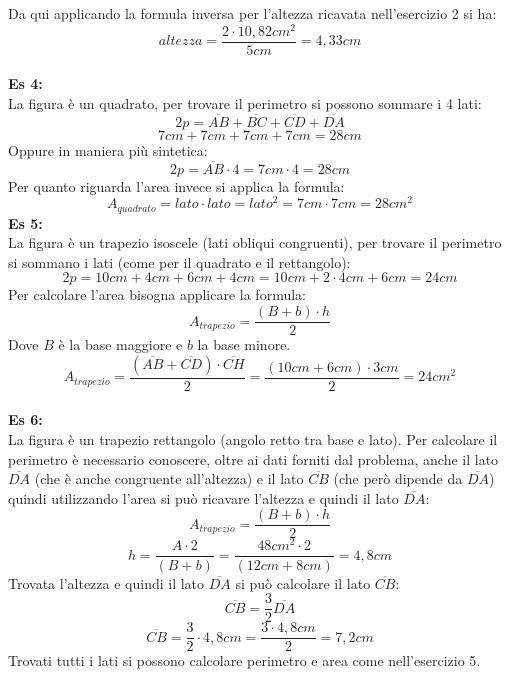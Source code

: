 \documentclass[14pt]{extarticle}
\begin{document}
Da qui applicando la formula inversa per l'altezza ricavata nell'esercizio 2 si ha:
$$altezza=\frac{2\cdot 10,82cm^2}{5cm}=4,33cm$$
\\
\textbf{Es 4:}
\\La figura è un quadrato, per trovare il perimetro si possono sommare i 4 lati:
$$2p=\overline{AB}+\overline{BC}+\overline{CD}+\overline{DA}$$
$$7cm+7cm+7cm+7cm=28cm$$
Oppure in maniera più sintetica:
$$2p=\overline{AB}\cdot4=7cm\cdot 4= 28cm$$
Per quanto riguarda l'area invece si applica la formula:
$$A_{quadrato}=lato\cdot lato=lato^2=7cm\cdot7cm=28cm^2$$
\newpage
\textbf{Es 5:}\\
La figura è un trapezio isoscele (lati obliqui congruenti), per trovare il perimetro si sommano i lati (come per il quadrato e il rettangolo):
$$2p=10cm+4cm+6cm+4cm=10cm+2\cdot4cm+6cm=24cm$$
Per calcolare l'area bisogna applicare la formula:
$$A_{trapezio}=\frac{(B+b)\cdot h}{2}$$
Dove $B$ è la base maggiore e $b$ la base minore.
$$A_{trapezio}=\frac{(\overline{AB}+\overline{CD})\cdot \overline{CH}}{2}=\frac{(10cm+6cm)\cdot 3cm}{2}=24cm^2$$
\\\textbf{Es 6:}\\
La figura è un trapezio rettangolo (angolo retto tra base e lato). Per calcolare il perimetro è necessario conoscere, oltre ai dati forniti dal problema, anche il lato $\overline{DA}$ (che è anche congruente all'altezza) e il lato $\overline{CB}$ (che però dipende da $\overline{DA}$) quindi utilizzando l'area si può ricavare l'altezza e quindi il lato $\overline{DA}$:
$$A_{trapezio}=\frac{(B+b)\cdot h}{2}$$
$$h=\frac{A\cdot2}{(B+b)}=\frac{48cm^2 \cdot 2}{(12cm+8cm)}=4,8cm$$
Trovata l'altezza e quindi il lato $\overline{DA}$ si può calcolare il lato $\overline{CB}$:
$$\overline{CB}=\frac{3}{2}\overline{DA}$$
$$\overline{CB}=\frac{3}{2}\cdot4,8cm=\frac{3\cdot 4,8cm}{2}=7,2cm$$
Trovati tutti i lati si possono calcolare perimetro e area come nell'esercizio 5.
\end{document}
